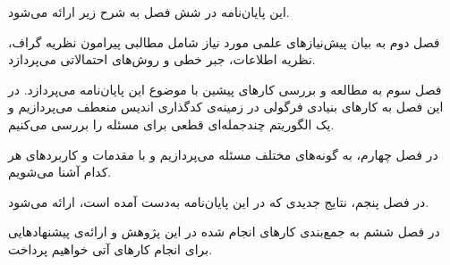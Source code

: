 این پایان‌نامه در شش فصل به شرح زیر ارائه می‌شود.

فصل دوم به بیان پیش‌نیازهای علمی مورد نیاز شامل مطالبی پیرامون نظریه گراف، نظریه اطلاعات، جبر خطی و روش‌های احتمالاتی  می‌پردازد.

فصل سوم به مطالعه و بررسی کارهای پیشین با موضوع این پایان‌نامه می‌پردازد. در این فصل به کارهای بنیادی فرگولی در زمینه‌ی کدگذاری اندیس منعطف می‌پردازیم و یک الگوریتم چندجمله‌ای قطعی برای مسئله را بررسی می‌کنیم.

در فصل چهارم، به گونه‌های مختلف مسئله می‌پردازیم و با مقدمات و کاربردهای هر کدام آشنا می‌شویم.

در فصل پنجم، نتایج جدیدی که در این پایان‌نامه به‌دست آمده است، ارائه می‌شود.

در فصل ششم به جمع‌بندی کارهای انجام شده در این پژوهش و ارائه‌ی پیشنهادهایی برای انجام کارهای آتی خواهیم پرداخت.